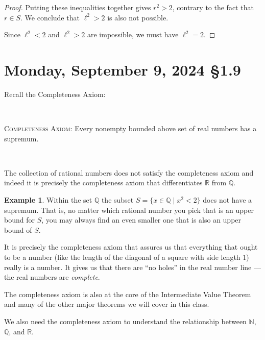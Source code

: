 \documentclass[12pt]{amsart}
\def\Mo{Monday}
\newcommand{\Q}{\mathbb{Q}}
\newcommand{\R}{{\mathbb{R}}}
\newcommand{\N}{\mathbb{N}}
\numberwithin{equation}{section}
\theoremstyle{plain} %
\newcommand{\Sept}[3]{\section{#2, September #1, 2024 \quad \S#3}}
\theoremstyle{definition}
\newtheorem{ex}[equation]{Example}
\theoremstyle{remark}
\begin{document}
\begin{framed}
\begin{proof}
Putting these inequalities together gives $r^2 > 2$, contrary to the fact that $r \in S$. We conclude that $\ell^2 > 2$ is also not possible.

Since $\ell^2 < 2$ and $\ell^2 > 2$ are impossible, we must have $\ell^2 = 2$.
\end{proof}
\end{framed}




\newpage

\Sept{9}{\Mo}{1.9}

Recall the Completeness Axiom:

\

\noindent \textsc{Completeness Axiom:} Every nonempty bounded above set of real numbers has a supremum.

\

The collection of rational numbers does not satisfy the completeness axiom and indeed it is precisely the completeness axiom that differentiates $\R$ from
$\Q$. 

\begin{ex} Within the set $\Q$ the subset $S = \{x \in \Q \mid x^2 < 2\}$ does not have a supremum. That is, no matter which rational number you pick that is an
  upper bound for $S$, you may always find an even smaller one that is also an upper bound of $S$. 
\end{ex}

It is precisely the completeness axiom that assures us that everything that ought to be a number (like the length of the diagonal of a square with side length $1$) really is a number.  It gives us that there are ``no holes'' in the real number line --- the real numbers are {\em
  complete}. 



The completeness axiom is also at the core of the Intermediate Value Theorem and many of the other major theorems we will
cover in this class. 

We also need the completeness axiom to understand the relationship between $\N$, $\Q$, and $\R$.
\end{document}
